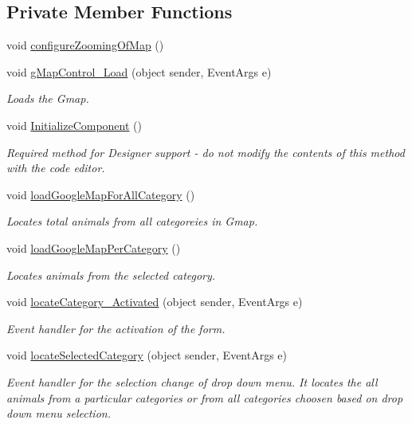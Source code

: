 \subsection*{Private Member Functions}
\begin{DoxyCompactItemize}
\item 
void \hyperlink{classWildlifeTrackingApp_1_1LocateCategory_a99a28fbc72be710413039cec9aeeba10}{configure\+Zooming\+Of\+Map} ()
\item 
void \hyperlink{classWildlifeTrackingApp_1_1LocateCategory_a7f17e416fe1ed8e8eba93a84a5aecb11}{g\+Map\+Control\+\_\+\+Load} (object sender, Event\+Args e)
\begin{DoxyCompactList}\small\item\em Loads the Gmap. \end{DoxyCompactList}\item 
void \hyperlink{classWildlifeTrackingApp_1_1LocateCategory_a6405d5db675d5338663195a4d12b4c9f}{Initialize\+Component} ()
\begin{DoxyCompactList}\small\item\em Required method for Designer support -\/ do not modify the contents of this method with the code editor. \end{DoxyCompactList}\item 
void \hyperlink{classWildlifeTrackingApp_1_1LocateCategory_a4556db306d6b4b0b473df21ef87398c5}{load\+Google\+Map\+For\+All\+Category} ()
\begin{DoxyCompactList}\small\item\em Locates total animals from all categoreies in Gmap. \end{DoxyCompactList}\item 
void \hyperlink{classWildlifeTrackingApp_1_1LocateCategory_a9b1d54086f1fa768d30c15fdc1971924}{load\+Google\+Map\+Per\+Category} ()
\begin{DoxyCompactList}\small\item\em Locates animals from the selected category. \end{DoxyCompactList}\item 
void \hyperlink{classWildlifeTrackingApp_1_1LocateCategory_ab9a46ca8e764049be2d465a144610180}{locate\+Category\+\_\+\+Activated} (object sender, Event\+Args e)
\begin{DoxyCompactList}\small\item\em Event handler for the activation of the form. \end{DoxyCompactList}\item 
void \hyperlink{classWildlifeTrackingApp_1_1LocateCategory_a613e5c1a6893ab25486d97ab4e17d7e8}{locate\+Selected\+Category} (object sender, Event\+Args e)
\begin{DoxyCompactList}\small\item\em Event handler for the selection change of drop down menu. It locates the all animals from a particular categories or from all categories choosen based on drop down menu selection. \end{DoxyCompactList}\end{DoxyCompactItemize}

